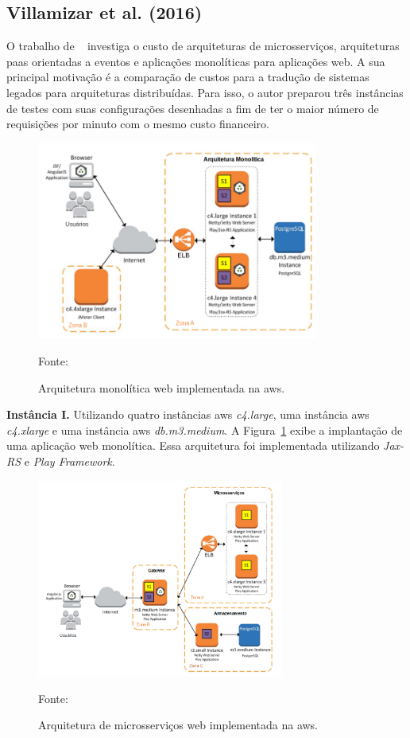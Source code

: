 \subsection{Villamizar et al. (2016)}



O trabalho de ~\cite{7515686} investiga o custo de arquiteturas de microsserviços, arquiteturas \ac{paas} orientadas a eventos e aplicações monolíticas para aplicações web.
%
A sua principal motivação é a comparação de custos para a tradução de sistemas legados para arquiteturas distribuídas.
%
Para isso, o autor preparou três instâncias de testes com suas configurações desenhadas a fim de ter o maior número de requisições por minuto com o mesmo custo financeiro.



\begin{figure}[htb!]
\caption{Arquitetura monolítica web implementada na \ac{aws}.}
\label{fig:aws_monolitico}
\includegraphics[height=6.5cm]{img/cap2/aws_monolitico.png}
\centering

Fonte:~\cite{7515686}
\end{figure}


\textbf{Instância I.} Utilizando quatro instâncias \ac{aws} \textit{c4.large}, uma instância \ac{aws} \textit{c4.xlarge} e uma instância \ac{aws} \textit{db.m3.medium}.
%
A Figura~\ref{fig:aws_monolitico} exibe a implantação de uma aplicação web monolítica.
%
Essa arquitetura foi implementada utilizando \textit{Jax-RS} e \textit{Play Framework}.




\begin{figure}[htb!]
\caption{Arquitetura de microsserviços web implementada na \ac{aws}.}
\label{fig:aws_microsservicos}
\includegraphics[height=6.5cm]{img/cap2/aws_microsservicos.png}
\centering

Fonte:~\cite{7515686}
\end{figure}

